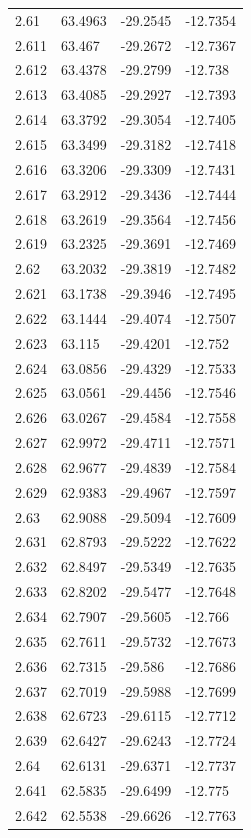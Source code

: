 \begin{tabular}{llll}
2.61 & 63.4963 & -29.2545 & -12.7354 \\
2.611 & 63.467 & -29.2672 & -12.7367 \\
2.612 & 63.4378 & -29.2799 & -12.738 \\
2.613 & 63.4085 & -29.2927 & -12.7393 \\
2.614 & 63.3792 & -29.3054 & -12.7405 \\
2.615 & 63.3499 & -29.3182 & -12.7418 \\
2.616 & 63.3206 & -29.3309 & -12.7431 \\
2.617 & 63.2912 & -29.3436 & -12.7444 \\
2.618 & 63.2619 & -29.3564 & -12.7456 \\
2.619 & 63.2325 & -29.3691 & -12.7469 \\
2.62 & 63.2032 & -29.3819 & -12.7482 \\
2.621 & 63.1738 & -29.3946 & -12.7495 \\
2.622 & 63.1444 & -29.4074 & -12.7507 \\
2.623 & 63.115 & -29.4201 & -12.752 \\
2.624 & 63.0856 & -29.4329 & -12.7533 \\
2.625 & 63.0561 & -29.4456 & -12.7546 \\
2.626 & 63.0267 & -29.4584 & -12.7558 \\
2.627 & 62.9972 & -29.4711 & -12.7571 \\
2.628 & 62.9677 & -29.4839 & -12.7584 \\
2.629 & 62.9383 & -29.4967 & -12.7597 \\
2.63 & 62.9088 & -29.5094 & -12.7609 \\
2.631 & 62.8793 & -29.5222 & -12.7622 \\
2.632 & 62.8497 & -29.5349 & -12.7635 \\
2.633 & 62.8202 & -29.5477 & -12.7648 \\
2.634 & 62.7907 & -29.5605 & -12.766 \\
2.635 & 62.7611 & -29.5732 & -12.7673 \\
2.636 & 62.7315 & -29.586 & -12.7686 \\
2.637 & 62.7019 & -29.5988 & -12.7699 \\
2.638 & 62.6723 & -29.6115 & -12.7712 \\
2.639 & 62.6427 & -29.6243 & -12.7724 \\
2.64 & 62.6131 & -29.6371 & -12.7737 \\
2.641 & 62.5835 & -29.6499 & -12.775 \\
2.642 & 62.5538 & -29.6626 & -12.7763 \\

\end{tabular}
